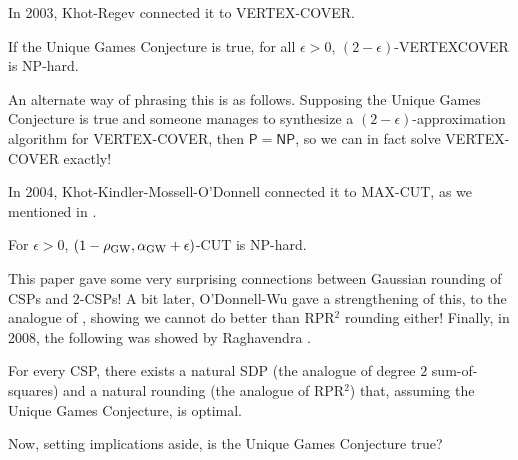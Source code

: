 		In 2003, Khot-Regev \cite{khot-regev-ugc-vtxcov} connected it to VERTEX-COVER.

		\begin{theorem}
			If the Unique Games Conjecture is true, for all $\epsilon > 0$, $(2-\epsilon)$-VERTEXCOVER is \textsf{NP}-hard.
		\end{theorem}
		An alternate way of phrasing this is as follows. Supposing the Unique Games Conjecture is true and someone manages to synthesize a $(2-\epsilon)$-approximation algorithm for VERTEX-COVER, then $\mathsf{P} = \mathsf{NP}$, so we can in fact solve VERTEX-COVER exactly!

		In 2004, Khot-Kindler-Mossell-O'Donnell \cite{max-cut-ugc} connected it to MAX-CUT, as we mentioned in .

		\begin{theorem}
			For $\epsilon > 0$, $(1-\rho_\text{GW},\alpha_{\text{GW}}+\epsilon)$-CUT is \textsf{NP}-hard.
		\end{theorem}
		This paper gave some very surprising connections between Gaussian rounding of CSPs and $2$-CSPs! A bit later, O'Donnell-Wu gave a strengthening of this, to the analogue of , showing we cannot do better than RPR$^2$ rounding either! Finally, in 2008, the following was showed by Raghavendra \cite{raghavendra-punchline}.

		\begin{ftheo}[Raghavendra]
			For every CSP, there exists a natural SDP (the analogue of degree $2$ sum-of-squares) and a natural rounding (the analogue of RPR$^2$) that, assuming the Unique Games Conjecture, is optimal.
		\end{ftheo}


		Now, setting implications aside, is the Unique Games Conjecture true?\\

